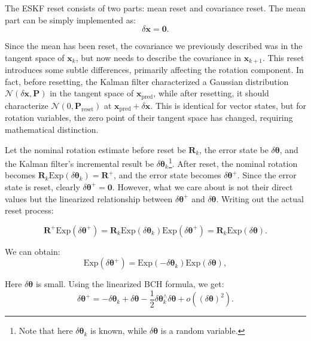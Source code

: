 The ESKF reset consists of two parts: mean reset and covariance reset. The mean part can be simply implemented as:
\begin{equation}\label{eq:mean-reset}
	\delta \bm{x} = \bm{0}.
\end{equation}

Since the mean has been reset, the covariance we previously described was in the tangent space of $\bm{x}_k$, but now needs to describe the covariance in $\bm{x}_{k+1}$. This reset introduces some subtle differences, primarily affecting the rotation component. In fact, before resetting, the Kalman filter characterized a Gaussian distribution $\mathcal{N}(\delta \bm{x}, \bm{P})$ in the tangent space of $\bm{x}_{\mathrm{pred}}$, while after resetting, it should characterize $\mathcal{N}(0, \bm{P}_{\mathrm{reset}})$ at $\bm{x}_{\mathrm{pred}} + \delta \bm{x}$. This is identical for vector states, but for rotation variables, the zero point of their tangent space has changed, requiring mathematical distinction.

Let the nominal rotation estimate before reset be $\bm{R}_k$, the error state be $\delta \boldsymbol{\theta}$, and the Kalman filter's incremental result be $\delta \boldsymbol{\theta}_k$\footnote{Note that here $\delta \boldsymbol{\theta}_k$ is known, while $\delta \boldsymbol{\theta}$ is a random variable.}. After reset, the nominal rotation becomes $\bm{R}_k \mathrm{Exp}(\delta \boldsymbol{\theta}_k)=\bm{R}^+$, and the error state becomes $\delta \boldsymbol{\theta}^+$. Since the error state is reset, clearly $\delta \boldsymbol{\theta}^+ = \bm{0}$. However, what we care about is not their direct values but the linearized relationship between $\delta \boldsymbol{\theta}^+$ and $\delta \boldsymbol{\theta}$. Writing out the actual reset process:

\begin{equation}\label{eq:reset-process}
	\bm{R}^+ \mathrm{Exp}(\delta \boldsymbol{\theta}^+) = \bm{R}_k \mathrm{Exp}(\delta \boldsymbol{\theta}_k) \mathrm{Exp}(\delta \boldsymbol{\theta}^+) = \bm{R}_k \mathrm{Exp}(\delta \boldsymbol{\theta}).
\end{equation}

We can obtain:
\begin{equation}\label{eq:reset-relation}
	\mathrm{Exp}(\delta \boldsymbol{\theta}^+) = \mathrm{Exp}(-\delta \boldsymbol{\theta}_k) \mathrm{Exp}(\delta \boldsymbol{\theta}),
\end{equation}

Here $\delta \boldsymbol{\theta}$ is small. Using the linearized BCH formula, we get:
\begin{equation}\label{eq:linearized-reset}
	\delta \boldsymbol{\theta}^+ = -\delta \boldsymbol{\theta}_k + \delta \boldsymbol{\theta} - \frac{1}{2} \delta \boldsymbol{\theta}_k^\wedge \delta \boldsymbol{\theta} + o((\delta \boldsymbol{\theta})^2) .
\end{equation}

